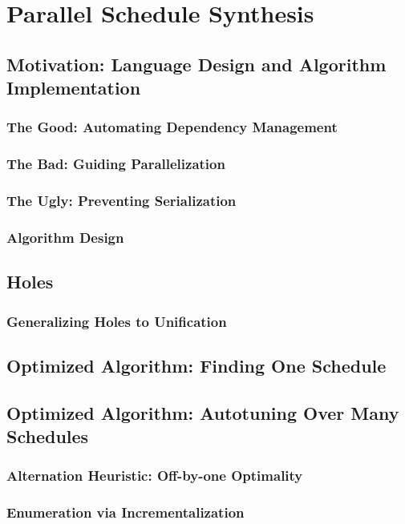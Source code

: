 \chapter{Parallel Schedule Synthesis}
\label{chap:4}

\section{Motivation: Language Design and Algorithm Implementation}
\subsection{The Good: Automating Dependency Management}
\subsection{The Bad: Guiding Parallelization}
\subsection{The Ugly: Preventing Serialization}
\subsection{Algorithm Design}

\section{Holes}
\subsection{Generalizing Holes to Unification}

\section{Optimized Algorithm: Finding One Schedule}

\section{Optimized Algorithm: Autotuning Over Many Schedules}
\subsection{Alternation Heuristic: Off-by-one Optimality}
\subsection{Enumeration via Incrementalization}

